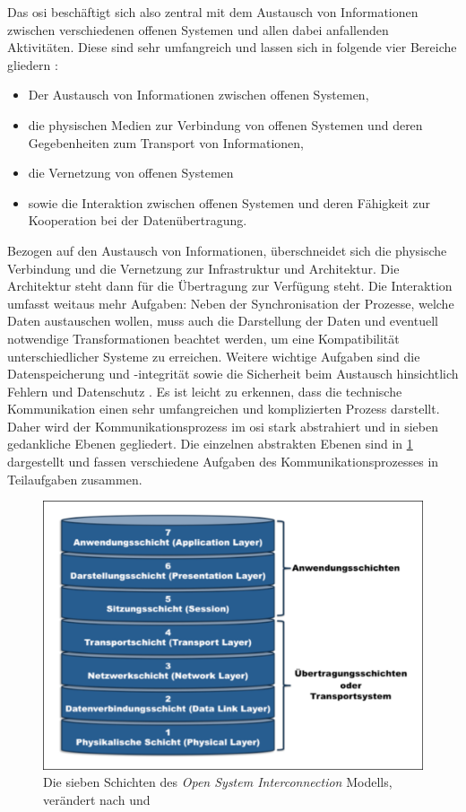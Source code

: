 Das \acrshort{osi} beschäftigt sich also zentral mit dem Austausch von Informationen zwischen verschiedenen offenen Systemen und allen dabei anfallenden Aktivitäten. Diese sind sehr umfangreich und lassen sich in folgende vier Bereiche gliedern \cite[S.~3f.]{osi96}:
\begin{itemize}
	\item Der Austausch von Informationen zwischen offenen Systemen,
	\item die physischen Medien zur Verbindung von offenen Systemen und deren Gegebenheiten zum Transport von Informationen,
	\item die Vernetzung von offenen Systemen
	\item sowie die Interaktion zwischen offenen Systemen und deren Fähigkeit zur Kooperation bei der Datenübertragung.
\end{itemize}
Bezogen auf den Austausch von Informationen, überschneidet sich die physische Verbindung und die Vernetzung zur Infrastruktur und Architektur. Die Architektur steht dann für die Übertragung zur Verfügung steht. Die Interaktion umfasst weitaus mehr Aufgaben: Neben der Synchronisation der Prozesse, welche Daten austauschen wollen, muss auch die Darstellung der Daten und eventuell notwendige Transformationen beachtet werden, um eine Kompatibilität unterschiedlicher Systeme zu erreichen. Weitere wichtige Aufgaben sind die Datenspeicherung und -integrität sowie die Sicherheit beim Austausch hinsichtlich Fehlern und Datenschutz \cite[S.~4]{osi96}.
Es ist leicht zu erkennen, dass die technische Kommunikation einen sehr umfangreichen und komplizierten Prozess darstellt. Daher wird der Kommunikationsprozess im \acrshort{osi} stark abstrahiert und in sieben gedankliche Ebenen gegliedert. Die einzelnen abstrakten Ebenen sind in \ref{fig:osi} dargestellt und fassen verschiedene Aufgaben des Kommunikationsprozesses in Teilaufgaben zusammen.

\begin{figure}
\centering
\includegraphics[width=\textwidth]{abbildungen/20160112_osi}
\caption[Die sieben Schichten des Open System Interconnection Modells]{Die sieben Schichten des \textit{Open System Interconnection} Modells, verändert nach \cite[S.~10]{schn06} und \cite[S.~28]{osi96}}
\label{fig:osi}
\end{figure}


